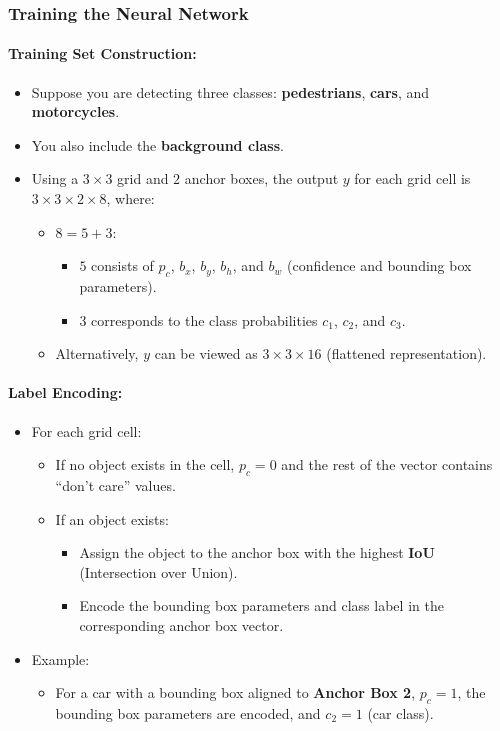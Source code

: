 \documentclass[letterpaper,12pt,notitlepage,twoside]{report}
\begin{document}
\subsubsection*{Training the Neural Network}

\paragraph{Training Set Construction:}
\begin{itemize}
    \item Suppose you are detecting three classes: \textbf{pedestrians}, \textbf{cars}, and \textbf{motorcycles}.
    \item You also include the \textbf{background class}.
    \item Using a $3 \times 3$ grid and $2$ anchor boxes, the output $y$ for each grid cell is $3 \times 3 \times 2 \times 8$, where:
    \begin{itemize}
        \item $8 = 5 + 3$: 
        \begin{itemize}
            \item $5$ consists of $p_c$, $b_x$, $b_y$, $b_h$, and $b_w$ (confidence and bounding box parameters).
            \item $3$ corresponds to the class probabilities $c_1$, $c_2$, and $c_3$.
        \end{itemize}
        \item Alternatively, $y$ can be viewed as $3 \times 3 \times 16$ (flattened representation).
    \end{itemize}
\end{itemize}

\paragraph{Label Encoding:}
\begin{itemize}
    \item For each grid cell:
    \begin{itemize}
        \item If no object exists in the cell, $p_c = 0$ and the rest of the vector contains ``don't care'' values.
        \item If an object exists:
        \begin{itemize}
            \item Assign the object to the anchor box with the highest \textbf{IoU} (Intersection over Union).
            \item Encode the bounding box parameters and class label in the corresponding anchor box vector.
        \end{itemize}
    \end{itemize}
    \item Example:
    \begin{itemize}
        \item For a car with a bounding box aligned to \textbf{Anchor Box 2}, $p_c = 1$, the bounding box parameters are encoded, and $c_2 = 1$ (car class).
    \end{itemize}
\end{itemize}
\end{document}
